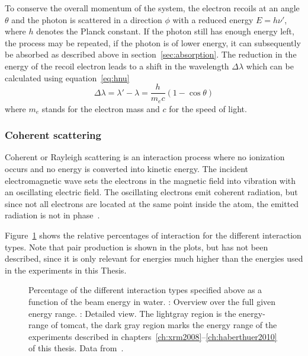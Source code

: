 To conserve the overall momentum of the system, the electron recoils at an angle $\theta$ and the photon is scattered in a direction $\phi$ with a reduced energy $E=h\nu'$, where $h$ denotes the Planck constant. If the photon still has enough energy left, the process may be repeated, if the photon is of lower energy, it can subsequently be absorbed as described above in section~\ref{sec:absorption}. The reduction in the energy of the recoil electron leads to a shift in the wavelength $\Delta\lambda$ which can be calculated using equation~\ref{eq:hnu}
\begin{equation}
	\Delta\lambda = \lambda' - \lambda = \frac{h}{m_e c}(1-\cos{\theta})
	\label{eq:hnu}
\end{equation}
where $m_e$ stands for the electron mass and $c$ for the speed of light.

\subsubsection{Coherent scattering}
Coherent or Rayleigh scattering is an interaction process where no ionization occurs and no energy is converted into kinetic energy. The incident electromagnetic wave sets the electrons in the magnetic field into vibration with an oscillating electric field. The oscillating electrons emit coherent radiation, but since not all electrons are located at the same point inside the atom, the emitted radiation is not in phase~\cite{Hsieh2003,Stampanoni2002}.

Figure~\ref{fig:InteractionPercentage} shows the relative percentages of interaction for the different interaction types. Note that pair production is shown in the plots, but has not been described, since it is only relevant for energies much higher than the energies used in the experiments in this Thesis.

\def\width{0.5\linewidth}%
\def\height{0.309\linewidth}%
\begin{figure}[htb]
	\noindent{}%
	\caption[Interaction types]{Percentage of the different interaction types specified above as a function of the beam energy in water. : Overview over the full given energy range. : Detailed view. The lightgray region is the energy-range of \ac{tomcat}, the dark gray region marks the energy range of the experiments described in chapters~\ref{ch:xrm2008}--\ref{ch:haberthuer2010} of this thesis. Data from~\cite[Table 5-5]{Johns1983}.}%
	\label{fig:InteractionPercentage}%
\end{figure}

